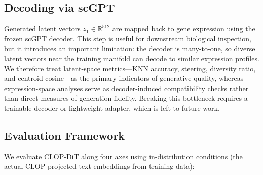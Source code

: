 \documentclass[preprint,12pt]{elsarticle}
\begin{document}
\subsection{Decoding via scGPT}\label{sec:decoding}

Generated latent vectors $z_1 \in \mathbb{R}^{512}$ are mapped back to gene expression using the frozen scGPT decoder. This step is useful for downstream biological inspection, but it introduces an important limitation: the decoder is many-to-one, so diverse latent vectors near the training manifold can decode to similar expression profiles. We therefore treat latent-space metrics---KNN accuracy, steering, diversity ratio, and centroid cosine---as the primary indicators of generative quality, whereas expression-space analyses serve as decoder-induced compatibility checks rather than direct measures of generation fidelity. Breaking this bottleneck requires a trainable decoder or lightweight adapter, which is left to future work.

\subsection{Evaluation Framework}\label{sec:evaluation}

We evaluate CLOP-DiT along four axes using in-distribution conditions (the actual CLOP-projected text embeddings from training data):
\end{document}
